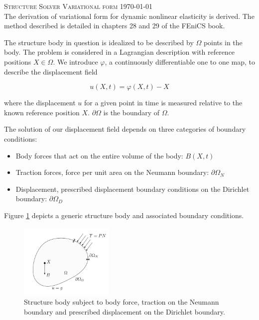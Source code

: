 \documentclass{article}
\begin{document}
\textsc{\Large Structure Solver Variational form \hfill \today}\\[0.5cm] %

The derivation of variational form for dynamic nonlinear elasticity is derived. The method described is detailed in chapters 28 and 29 of the FEniCS book. 

The structure body in question is idealized to be described by $\Omega$ points in the body.  The problem is considered in a Lagrangian description with reference positions $X \in \Omega$. We introduce $\varphi$, a continuously differentiable one to one map, to describe the displacement field  

\begin{equation}
u(X,t) = \varphi (X,t) - X
\end{equation}

where the displacement $u$ for a given point in time is measured relative to the known reference position $X$. 
$\partial \Omega$ is the boundary of $\Omega$. 

The solution of our displacement field depends on three categories of boundary conditions:

\begin{itemize}
\item Body forces that act on the entire volume of the body: $B(X,t)$
\item Traction forces, force per unit area on the Neumann boundary: $\partial \Omega_N$
\item Displacement, prescribed displacement boundary conditions on the Dirichlet boundary: $\partial \Omega_D$
\end{itemize}

Figure \ref{fig:structure} depicts a generic structure body and associated boundary conditions. 

\FloatBarrier
\begin{figure}[h]
\centering
	\includegraphics[width=0.4\textwidth]{structure}
	\caption{Structure body subject to body force, traction on the Neumann boundary and prescribed displacement on the Dirichlet boundary. \cite{logg2012automated} }
	\label{fig:structure}
\end{figure}
\FloatBarrier
\end{document}
